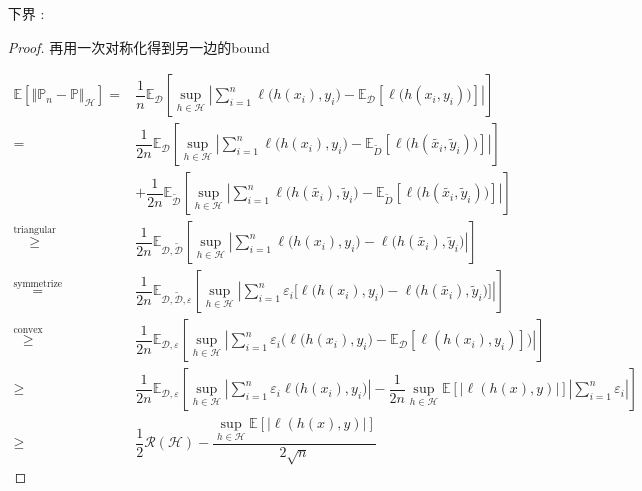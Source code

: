 \documentclass[11pt,a4paper]{ctexart}
\numberwithin{equation}{section}%
\begin{document}
\begin{itemize}[topsep=2pt,itemsep=0pt]
\begin{proof}
        
    \end{proof}

    \item[下界]: 
    \begin{proof}
        再用一次对称化得到另一边的bound

        \begin{align*}
            \mathbb{E}\left[ \left\Vert \mathbb{P}_n-\mathbb{P} \right\Vert _\mathcal{H} \right]= &\dfrac{ 1 }{ n }  \mathbb{E}_{\mathcal{D}}\left[ \mathop{ \sup  }\limits_{h\in\mathcal{H}}  \left\vert  \sum_{i=1}^n \ell\bigl(h(x_i), y_i\bigr) - \mathbb{E}_{\mathcal{D}}\left[ \ell\bigl(h({x_i}, {y}_i)\bigr) \right]  \right\vert \right]   \\
            = & \dfrac{ 1 }{ 2n }  \mathbb{E}_{\mathcal{D}}\left[ \mathop{ \sup  }\limits_{h\in\mathcal{H}}  \left\vert  \sum_{i=1}^n \ell\bigl(h(x_i), y_i\bigr) - \mathbb{E}_{\tilde{D}}\left[ \ell\bigl(h(\tilde{x_i}, \tilde{y}_i)\bigr) \right]  \right\vert \right] \\
            &+ \dfrac{ 1 }{ 2n }  \mathbb{E}_{\tilde{\mathcal{D}}}\left[ \mathop{ \sup  }\limits_{h\in\mathcal{H}}  \left\vert  \sum_{i=1}^n \ell\bigl(h(\tilde{x_i}), \tilde{y}_i\bigr) - \mathbb{E}_{\tilde{D}}\left[ \ell\bigl(h(\tilde{x_i}, \tilde{y}_i)\bigr) \right]  \right\vert \right]\\
            \mathop{ \geq }\limits^{\text{triangular}} &  \dfrac{ 1 }{ 2n }  \mathbb{E}_{\mathcal{D},\tilde{\mathcal{D}}}\left[ \mathop{ \sup  }\limits_{h\in\mathcal{H}}  \left\vert  \sum_{i=1}^n \ell\bigl(h(x_i), y_i\bigr) - \ell\bigl(h(\tilde{x_i}), \tilde{y}_i\bigr)  \right\vert \right]\\
            \mathop{ = }\limits^{\text{symmetrize}} &  \dfrac{ 1 }{ 2n }  \mathbb{E}_{\mathcal{D},\tilde{\mathcal{D}}, \varepsilon }\left[ \mathop{ \sup  }\limits_{h\in\mathcal{H}}  \left\vert  \sum_{i=1}^n \varepsilon _i \big[ \ell\bigl(h(x_i), y_i\bigr) - \ell\bigl(h(\tilde{x_i}), \tilde{y}_i\bigr) \big] \right\vert \right]\\
            \mathop{ \geq  }\limits^{\text{convex}} & \dfrac{ 1 }{ 2n }  \mathbb{E}_{\mathcal{D}, \varepsilon }\left[ \mathop{ \sup  }\limits_{h\in\mathcal{H}}  \left\vert  \sum_{i=1}^n \varepsilon _i \bigl(\ell\bigl(h(x_i), y_i\bigr) - \mathbb{E}_{\mathcal{D}}\left[ \ell(h(x_i),y_i) \right] \bigr)\right\vert \right] \\
            \geq &\dfrac{ 1 }{ 2n }  \mathbb{E}_{\mathcal{D}, \varepsilon }\left[ \mathop{ \sup  }\limits_{h\in\mathcal{H}}  \left\vert  \sum_{i=1}^n \varepsilon _i \ell\bigl(h(x_i), y_i\bigr)  \right\vert  - \dfrac{ 1 }{ 2n } \mathop{ \sup  }\limits_{h\in\mathcal{H}}\mathbb{E}\left[ \left\vert\ell(h(x),y) \right\vert  \right]\left\vert \sum_{i=1}^n \varepsilon _i \right\vert   \right]\\
            \geq & \dfrac{ 1 }{ 2 } \mathcal{R}(\mathcal{H})-\dfrac{ \mathop{ \sup  }\limits_{h\in\mathcal{H}}\mathbb{E}\left[ \left\vert\ell(h(x),y) \right\vert  \right] }{ 2\sqrt{n} } 
        \end{align*}
    \end{proof}
   

\end{itemize}
\end{document}
